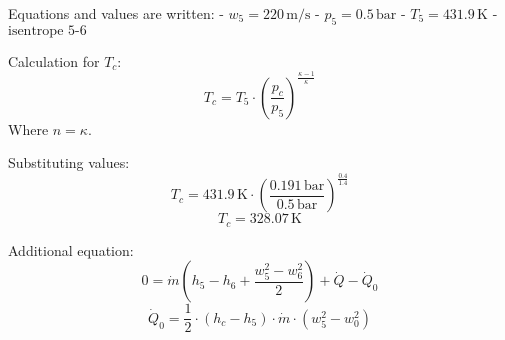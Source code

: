 Equations and values are written:  
- \( w_5 = 220 \, \text{m/s} \)  
- \( p_5 = 0.5 \, \text{bar} \)  
- \( T_5 = 431.9 \, \text{K} \)  
- \( \text{isentrope 5-6} \)  

Calculation for \( T_c \):  
\[ T_c = T_5 \cdot \left( \frac{p_c}{p_5} \right)^{\frac{\kappa - 1}{\kappa}} \]  
Where \( n = \kappa \).  

Substituting values:  
\[ T_c = 431.9 \, \text{K} \cdot \left( \frac{0.191 \, \text{bar}}{0.5 \, \text{bar}} \right)^{\frac{0.4}{1.4}} \]  
\[ T_c = 328.07 \, \text{K} \]  

Additional equation:  
\[ 0 = \dot{m} \left( h_5 - h_6 + \frac{w_5^2 - w_6^2}{2} \right) + \dot{Q} - \dot{Q}_0 \]  
\[ \dot{Q}_0 = \frac{1}{2} \cdot (h_c - h_5) \cdot \dot{m} \cdot (w_5^2 - w_0^2) \]